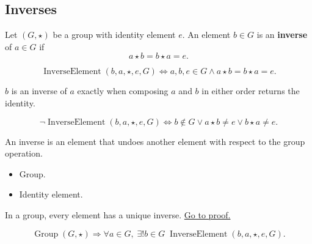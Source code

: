 \subsection*{Inverses}
\label{subsec:inverses}

\begin{definition}
\label{def:inverse-element}
Let $(G,\star)$ be a group with identity element $e$.
An element $b\in G$ is an \textbf{inverse} of $a\in G$ if
\[
a\star b=b\star a=e.
\]
\end{definition}

\begin{remark*}
\[
\operatorname{InverseElement}(b,a,\star,e,G)
\Longleftrightarrow
a,b,e\in G
\land
a\star b=b\star a=e.
\]
\end{remark*}

\begin{remark*}
$b$ is an inverse of $a$ exactly when composing $a$ and $b$ in either order
returns the identity.
\end{remark*}

\begin{remark*}
\[
\neg\operatorname{InverseElement}(b,a,\star,e,G)
\Longleftrightarrow
b\notin G
\lor
a\star b\neq e
\lor
b\star a\neq e.
\]
\end{remark*}

\begin{remark*}[Interpretation]
An inverse is an element that undoes another element with respect to the group
operation.
\end{remark*}

\begin{remark*}[Dependencies]
\begin{itemize}
  \item Group.
  \item Identity element.
\end{itemize}
\end{remark*}

\begin{proposition}
\label{prop:group-inverse-unique}
In a group, every element has a unique inverse.
\hyperref[prf:group-inverse-unique]{Go to proof.}
\end{proposition}

\begin{remark*}
\[
\operatorname{Group}(G,\star)
\Longrightarrow
\forall a\in G,\; \exists! b\in G\;
\operatorname{InverseElement}(b,a,\star,e,G).
\]
\end{remark*}

